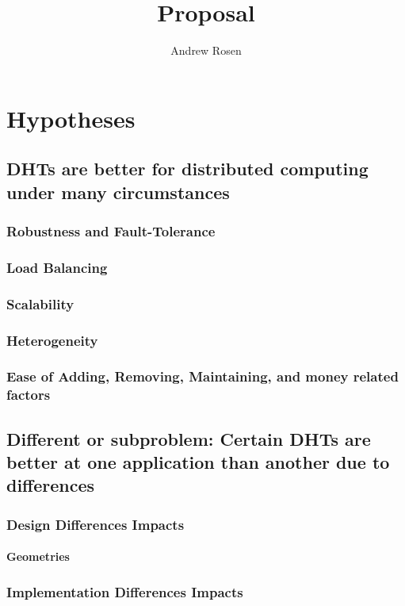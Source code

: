 \documentclass[10pt,letterpaper]{article}
\title{Proposal}
\author{Andrew Rosen}
\begin{document}
\maketitle
\setcounter{tocdepth}{4}
\tableofcontents
\newpage
\section{Hypotheses}

\subsection{DHTs are better for distributed computing under many circumstances}
\subsubsection{Robustness and Fault-Tolerance}
\subsubsection{Load Balancing}
\subsubsection{Scalability}
\subsubsection{Heterogeneity}
\subsubsection{Ease of Adding, Removing, Maintaining, and money related factors}

\subsection{Different or subproblem: Certain DHTs are better at one application than another due to differences}
\subsubsection{Design Differences Impacts}
\paragraph{Geometries}
\subsubsection{Implementation Differences Impacts}
\end{document}
